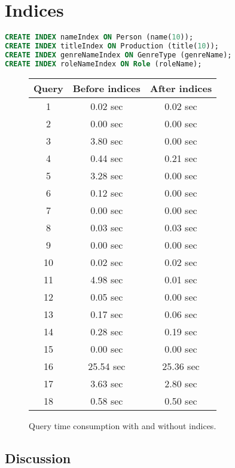 \lstset{
	basicstyle=\normalsize
}

\section{Indices}
\begin{lstlisting}[language=sql]
CREATE INDEX nameIndex ON Person (name(10));
CREATE INDEX titleIndex ON Production (title(10));
CREATE INDEX genreNameIndex ON GenreType (genreName);
CREATE INDEX roleNameIndex ON Role (roleName);
\end{lstlisting}

\begin{figure}[ht]
	\centering
	\begin{tabular}{c|c|c}
		\textbf{Query} & \textbf{Before indices} & \textbf{After indices}\\
		\hline
		1 & 0.02 sec & 0.02 sec\\
		2 & 0.00 sec & 0.00 sec\\
		3 & 3.80 sec & 0.00 sec\\
		4 & 0.44 sec & 0.21 sec\\
		5 & 3.28 sec & 0.00 sec\\
		6 & 0.12 sec & 0.00 sec\\
		7 & 0.00 sec & 0.00 sec\\
		8 & 0.03 sec & 0.03 sec\\
		9 & 0.00 sec & 0.00 sec\\
		10 & 0.02 sec & 0.02 sec\\
		11 & 4.98 sec & 0.01 sec\\
		12 & 0.05 sec & 0.00 sec\\
		13 & 0.17 sec & 0.06 sec\\
		14 & 0.28 sec & 0.19 sec\\
		15 & 0.00 sec & 0.00 sec\\
		16 & 25.54 sec & 25.36 sec\\
		17 & 3.63 sec & 2.80 sec\\
		18 & 0.58 sec & 0.50 sec
	\end{tabular}
	\caption{Query time consumption with and without indices.}
\end{figure}

\subsection{Discussion}


